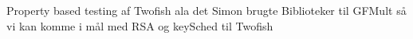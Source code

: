 Property based testing af Twofish ala det Simon brugte
Biblioteker til GFMult så vi kan komme i mål med RSA og keySched til Twofish
